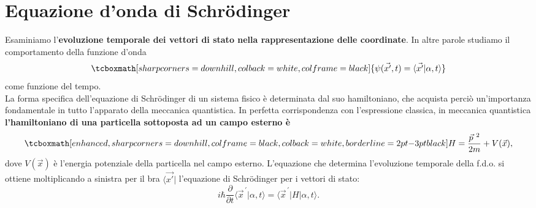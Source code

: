 \documentclass[a4paper,12pt,oneside]{book}
\begin{document}
\section[ Equazione d'onda di Schrödinger]{Equazione d'onda di Schr\"{o}dinger}
Esaminiamo l'\textbf{evoluzione temporale dei vettori di stato nella rappresentazione delle coordinate}. In altre parole studiamo il comportamento della funzione d'onda
	\begin{equation}
		\tcboxmath[sharp corners=downhill, colback=white, colframe=black]{
		\psi (\vec{x'}, t) = \langle \vec{x'}\vert \alpha, t \rangle
		}
	\end{equation}
come funzione del tempo.\\

La forma specifica dell'equazione di Schr\"{o}dinger di un sistema fisico è determinata dal suo hamiltoniano, che acquista perciò un'importanza fondamentale in tutto l'apparato della meccanica quantistica. In perfetta corrispondenza con l'espressione classica, in meccanica quantistica \textbf{l'hamiltoniano di una particella sottoposta ad un campo esterno è}
	\begin{equation}
		\tcboxmath[enhanced, sharp corners=downhill, colframe=black, colback=white, borderline={2pt}{-3pt}{black}]{
			H= \frac{\vec{p}^{\ 2}}{2m}+V(\vec{x}),
			}
	\label{eq:cap8_5}
	\end{equation}
dove $V(\vec{x})$ è l'energia potenziale della particella nel campo esterno.		
L'equazione che determina l'evoluzione temporale della f.d.o. si ottiene moltiplicando a sinistra per il bra $\langle \vec{x'}\vert $ l'equazione di Schr\"{o}dinger per i vettori di stato:
	\begin{equation}
		i\hbar \frac{\partial}{\partial t} \langle {\vec{x}}^{\, \prime}\vert \alpha , t \rangle = \langle {\vec{x}}^{\, \prime}\vert H \vert \alpha , t \rangle.
	\end{equation}\\
	
\end{document}
